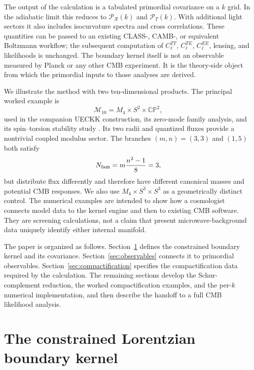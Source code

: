 \documentclass[aps,prd,twocolumn,superscriptaddress,nofootinbib,longbibliography,floatfix]{revtex4-2}
\newcommand{\cM}{\mathcal M}
\newcommand{\CP}{\mathbb{CP}}
\begin{document}
The output of the calculation is a tabulated primordial covariance on a $k$ grid.  In the adiabatic limit this reduces to $\mathcal P_{\mathcal R}(k)$ and $\mathcal P_T(k)$.  With additional light sectors it also includes isocurvature spectra and cross correlations.  These quantities can be passed to an existing CLASS-, CAMB-, or equivalent Boltzmann workflow; the subsequent computation of $C_\ell^{TT}$, $C_\ell^{TE}$, $C_\ell^{EE}$, lensing, and likelihoods is unchanged.  The boundary kernel itself is not an observable measured by Planck or any other CMB experiment.  It is the theory-side object from which the primordial inputs to those analyses are derived.

We illustrate the method with two ten-dimensional products.  The principal worked example is
\begin{equation}
\cM_{10}=M_4\times S^2\times\CP^2,
\end{equation}
used in the companion UECKK construction, its zero-mode family analysis, and its spin--torsion stability study \cite{ShayaUECKK2026,ShayaZeroModes2026,ShayaVacuum2026}.  Its two radii and quantized fluxes provide a nontrivial coupled modulus sector.  The branches $(m,n)=(3,3)$ and $(1,5)$ both satisfy
\begin{equation}
N_{\rm fam}=m\frac{n^2-1}{8}=3,
\end{equation}
but distribute flux differently and therefore have different canonical masses and potential CMB responses.  We also use $M_4\times S^3\times S^3$ as a geometrically distinct control.  The numerical examples are intended to show how a cosmologist connects model data to the kernel engine and then to existing CMB software.  They are screening calculations, not a claim that present microwave-background data uniquely identify either internal manifold.

The paper is organized as follows.  Section~\ref{sec:kernel} defines the constrained boundary kernel and its covariance.  Section~\ref{sec:observables} connects it to primordial observables.  Section~\ref{sec:compactification} specifies the compactification data required by the calculation.  The remaining sections develop the Schur-complement reduction, the worked compactification examples, and the per-$k$ numerical implementation, and then describe the handoff to a full CMB likelihood analysis.

\section{The constrained Lorentzian boundary kernel}
\label{sec:kernel}
\end{document}
